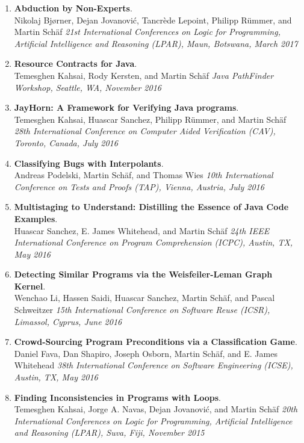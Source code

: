 \begin{enumerate}
  \item \textbf{Abduction by Non-Experts}.
  \\  Nikolaj Bjørner, Dejan Jovanović, Tancrède Lepoint, Philipp Rümmer, and Martin Schäf
  \emph{21st International Conferences on Logic for Programming, Artificial Intelligence and Reasoning (LPAR), Maun, Botswana, March 2017}

  \item \textbf{Resource Contracts for Java}.
  \\  Temesghen Kahsai, Rody Kersten, and Martin Schäf
  \emph{Java PathFinder Workshop, Seattle, WA, November 2016}

  \item \textbf{JayHorn: A Framework for Verifying Java programs}.
  \\  Temesghen Kahsai, Huascar Sanchez, Philipp Rümmer, and Martin Schäf
  \emph{28th International Conference on Computer Aided Verification (CAV), Toronto, Canada, July 2016}

  \item \textbf{Classifying Bugs with Interpolants}.
  \\  Andreas Podelski, Martin Schäf, and Thomas Wies
  \emph{10th International Conference on Tests and Proofs (TAP), Vienna, Austria, July 2016}

  \item \textbf{Multistaging to Understand: Distilling the Essence of Java Code Examples}.
  \\  Huascar Sanchez, E. James Whitehead, and Martin Schäf
  \emph{24th IEEE International Conference on Program Comprehension (ICPC), Austin, TX, May 2016}

  \item \textbf{Detecting Similar Programs via the Weisfeiler-Leman Graph Kernel}.
  \\  Wenchao Li, Hassen Saidi, Huascar Sanchez, Martin Schäf, and Pascal Schweitzer
  \emph{15th International Conference on Software Reuse (ICSR), Limassol, Cyprus, June 2016}

  \item \textbf{Crowd-Sourcing Program Preconditions via a Classification Game}.
  \\  Daniel Fava, Dan Shapiro, Joseph Osborn, Martin Schäf, and E. James Whitehead
  \emph{38th International Conference on Software Engineering (ICSE), Austin, TX, May 2016}

  \item \textbf{Finding Inconsistencies in Programs with Loops}.
  \\  Temesghen Kahsai, Jorge A. Navas, Dejan Jovanović, and Martin Schäf
  \emph{20th International Conferences on Logic for Programming, Artificial Intelligence and Reasoning (LPAR), Suva, Fiji, November 2015}


\end{enumerate}
